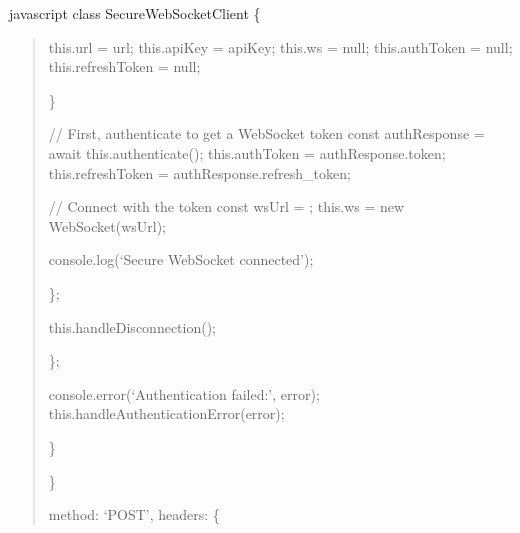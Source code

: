 \documentclass[letterpaper,10pt,english]{sphinxmanual}
\begin{document}
\sphinxAtStartPar
{\color{red}\bfseries{}\textasciigrave{}\textasciigrave{}}{\color{red}\bfseries{}\textasciigrave{}}javascript
class SecureWebSocketClient \{
\begin{quote}
\begin{description}
\sphinxAtStartPar
this.url = url;
this.apiKey = apiKey;
this.ws = null;
this.authToken = null;
this.refreshToken = null;

\end{description}

\sphinxAtStartPar
\}
\begin{description}
\begin{description}
\sphinxAtStartPar
// First, authenticate to get a WebSocket token
const authResponse = await this.authenticate();
this.authToken = authResponse.token;
this.refreshToken = authResponse.refresh\_token;

\sphinxAtStartPar
// Connect with the token
const wsUrl = ;
this.ws = new WebSocket(wsUrl);
\begin{description}
\sphinxAtStartPar
console.log(‘Secure WebSocket connected’);

\end{description}

\sphinxAtStartPar
\};
\begin{description}
\sphinxAtStartPar
this.handleDisconnection();

\end{description}

\sphinxAtStartPar
\};

\sphinxAtStartPar
console.error(‘Authentication failed:’, error);
this.handleAuthenticationError(error);

\end{description}

\sphinxAtStartPar
\}

\end{description}

\sphinxAtStartPar
\}
\begin{description}
\begin{description}
\sphinxAtStartPar
method: ‘POST’,
headers: \{
\begin{quote}


\end{quote}
\end{description}
\end{description}
\end{quote}
\end{document}
